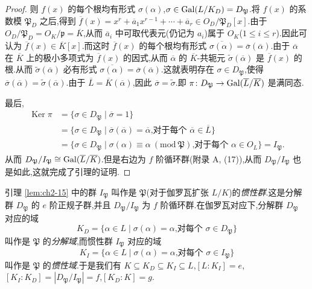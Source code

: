 \begin{proof}
则 $f(x)$ 的每个根均有形式 $\sigma(\alpha)$,$\sigma\in\operatorname{Gal}(L/K_D)=D_{\mathfrak{P}}$.将 $f(x)$ 的系数模 $\mathfrak{P}_D$ 之后,得到 $\overline{f}(x)=x^r+\overline{a}_1x^{r-1}+\cdots+\overline{a}_r\in O_D/\mathfrak{P}_D[x]$.由于 $O_D/\mathfrak{P}_D=O_K/\mathfrak{p}=\overline{K}$,从而 $\overline{a}_i$ 中可取代表元(仍记为 $a_i$)属于 $O_K$($1\leqslant i\leqslant r$).因此可认为 $\overline{f}(x)\in\overline{K}[x]$.而这时 $\overline{f}(x)$ 的每个根均有形式 $\overline{\sigma(\alpha)}=\overline{\sigma}(\overline{\alpha})$.由于 $\overline{\alpha}$ 在 $\overline{K}$ 上的极小多项式为 $\overline{f}(x)$ 的因式,从而 $\overline{\alpha}$ 的 $\overline{K}$-共轭元 $\widetilde{\sigma}(\overline{\alpha})$ 是 $\overline{f}(x)$ 的根.从而 $\widetilde{\sigma}(\overline{\alpha})$ 必有形式 $\overline{\sigma(\alpha)}=\overline{\sigma}(\overline{\alpha})$.这就表明存在 $\sigma\in D_{\mathfrak{P}}$,使得 $\overline{\sigma}(\overline{\alpha})=\widetilde{\sigma}(\overline{\alpha})$.由于 $\overline{L}=\overline{K}(\overline{\alpha})$,因此 $\overline{\sigma}=\widetilde{\sigma}$.即 $\pi\colon D_{\mathfrak{P}}\to\operatorname{Gal}(\overline{L}/\overline{K})$ 是满同态.

最后,
\begin{align*}
  \operatorname{Ker}\pi&=\{\sigma\in D_{\mathfrak{P}}\mid\overline{\sigma}=1\}\\
  &=\{\sigma\in D_{\mathfrak{P}}\mid\overline{\sigma}(\overline{\alpha})=\overline{\alpha}\text{,对于每个 }\overline{\alpha}\in\overline{L}\}\\
  &=\{\sigma\in D_{\mathfrak{P}}\mid\sigma(\alpha)\equiv\alpha\ (\mathrm{mod}\ \mathfrak{P})\text{,对于每个 }\alpha\in O_L\}=I_{\mathfrak{P}}.
\end{align*}
从而 $D_{\mathfrak{P}}/I_{\mathfrak{P}}\cong\operatorname{Gal}(\overline{L}/\overline{K})$.但是右边为 $f$ 阶循环群(附录 A, (17)),从而 $D_{\mathfrak{P}}/I_{\mathfrak{P}}$ 也是如此,这就完成了引理的证明.
\end{proof}

引理 \ref{lem:ch2-15} 中的群 $I_{\mathfrak{P}}$ 叫作是 $\mathfrak{P}$(对于伽罗瓦扩张 $L/K$)的\emph{惯性群}.这是分解群 $D_{\mathfrak{P}}$ 的 $e$ 阶正规子群,并且 $D_{\mathfrak{P}}/I_{\mathfrak{P}}$ 为 $f$ 阶循环群.在伽罗瓦对应下,分解群 $D_{\mathfrak{P}}$ 对应的域
\[
  K_D=\{\alpha\in L\mid\sigma(\alpha)=\alpha\text{,对每个 }\sigma\in D_{\mathfrak{P}}\}
\]
叫作是 $\mathfrak{P}$ 的\emph{分解域},而惯性群 $I_{\mathfrak{P}}$ 对应的域
\[
  K_I=\{\alpha\in L\mid\sigma(\alpha)=\alpha\text{,对每个 }\sigma\in I_{\mathfrak{P}}\}
\]
叫作是 $\mathfrak{P}$ 的\emph{惯性域}.于是我们有 $K\subseteq K_D\subseteq K_I\subseteq L$,$[L:K_I]=e$,$[K_I:K_D]=|D_{\mathfrak{P}}/I_{\mathfrak{P}}|=f$,$[K_D:K]=g$.

